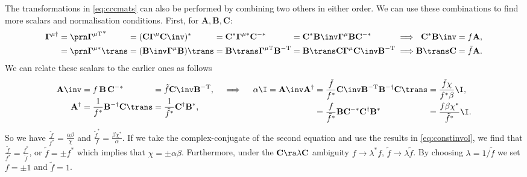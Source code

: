 \documentclass[11pt]{article}
\newcommand{\invd}{^{-\dag}}
\newcommand{\invt}{^{-\mathrm{T}}}
\newcommand{\invc}{^{-\ast}}
\newcommand{\Gammab}{\boldsymbol{\Gamma}}
\newcommand{\mud}{{\mu\dag}}
\newcommand{\mut}{{\mu\mathrm{T}}}
\newcommand{\muc}{{\mu\ast}}
\newcommand{\A}{\mathbf{A}}
\newcommand{\B}{\mathbf{B}}
\renewcommand{\C}{\mathbf{C}}
\begin{document}
The transformations in \cref{eq:cccmats} can also be performed by combining two others in either order.
We can use these combinations to find more scalars and normalisation conditions.
First, for $\A,\B,\C$:
%
\begin{equation*}
\begin{alignedat}{6}
  \Gammab^\mud &= \Gammap[\mut]^\ast &
    &= (\C \Gammab^\mu \C\inv)^\ast &
    &= \C^\ast \Gammab^\muc \C\invc &
    &= \C^\ast \B\inv \Gammab^\mu \B \C\invc &
    &\implies &
  \C^\ast \B\inv &= f \A, \\
    &= \Gammap[\muc]\trans &
    &= (\B\inv \Gammab^\mu \B)\trans &
    &= \B\trans \Gammab^\mut \B\invt &
    &= \B\trans \C \Gammab^\mu \C\inv \B\invt &
    &\implies &
  \B\trans \C &= \tilde{f} \A. \\
\end{alignedat}
\end{equation*}
%
We can relate these scalars to the earlier ones as follows
%
\begin{equation*}
\begin{alignedat}[t]{2}
  \A\inv &= f \, \B \, \C\invc &
    &= \tilde{f} \C\inv \B\invt, \\
  \A^\dag &= \frac{1}{f^\ast} \B\invd \C\trans &
    &= \frac{1}{\tilde{f}^\ast} \C^\dag \B^\ast,
\end{alignedat}
   \quad\implies\quad
\begin{alignedat}[t]{3}
  \alpha \I &= \A\inv \A^\dag &
    &= \frac{\tilde{f}}{f^\ast} \C\inv \B\invt \B\invd \C\trans &
      &= \frac{\tilde{f} \chi}{f^\ast \beta} \I, \\ &&
    &= \frac{f}{\tilde{f}^\ast} \B \C\invc \C^\dag \B^\ast &
      &= \frac{f \beta \chi^\ast}{\tilde{f}^\ast} \I.
\end{alignedat}
\end{equation*}
%
So we have \( \frac{\tilde{f}}{f^\ast} = \frac{\alpha \beta}{\chi} \)
and \( \frac{\tilde{f}^\ast}{f} = \frac{\beta \chi^\ast}{\alpha} \).
If we take the complex-conjugate of the second equation and use the results in \cref{eq:constinvol},
we find that \( \frac{\tilde{f}}{f^\ast} = \frac{f^\ast}{\tilde{f}} \),
or \( \tilde{f} = \pm f^\ast \) which implies that $\chi = \pm \alpha \beta$.
Furthermore, under the $\C \ra \lambda \C$ ambiguity \( f \rightarrow \lambda^\ast f\),
\(\tilde{f} \rightarrow \lambda \tilde{f} \).
By choosing $\lambda = 1/\tilde{f}$ we set $f = \pm1$ and $\tilde{f} = 1$.
\end{document}
